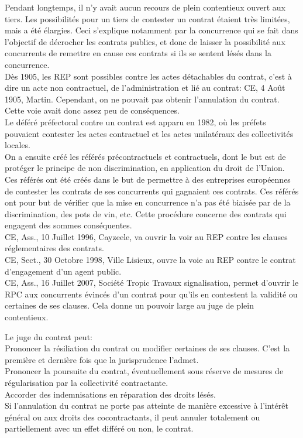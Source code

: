 \documentclass[10pt, a4paper, openany]{book}
\begin{document}
Pendant longtemps, il n'y avait aucun recours de plein contentieux ouvert aux tiers. Les possibilités pour un tiers de contester un contrat étaient très limitées, mais a été élargies. Ceci s'explique notamment par la concurrence qui se fait dans l'objectif de décrocher les contrats publics, et donc de laisser la possibilité aux concurrents de remettre en cause ces contrats si ils se sentent lésés dans la concurrence. \\
Dès 1905, les REP sont possibles contre les actes détachables du contrat, c'est à dire un acte non contractuel, de l'administration et lié au contrat: CE, 4 Août 1905, Martin. Cependant, on ne pouvait pas obtenir l'annulation du contrat. Cette voie avait donc assez peu de conséquences. \\
Le déféré préfectoral contre un contrat est apparu en 1982, où les préfets pouvaient contester les actes contractuel et les actes unilatéraux des collectivités locales. \\
On a ensuite créé les référés précontractuels et contractuels, dont le but est de protéger le principe de non discrimination, en application du droit de l'Union. Ces référés ont été créés dans le but de permettre à des entreprises européennes de contester les contrats de ses concurrents qui gagnaient ces contrats. Ces référés ont pour but de vérifier que la mise en concurrence n'a pas été biaisée par de la discrimination, des pots de vin, etc. Cette procédure concerne des contrats qui engagent des sommes conséquentes. \\
CE, Ass., 10 Juillet 1996, Cayzeele, va ouvrir la voir au REP contre les clauses réglementaires des contrats. \\
CE, Sect., 30 Octobre 1998, Ville Lisieux, ouvre la voie au REP contre le contrat d'engagement d'un agent public. \\
CE, Ass., 16 Juillet 2007, Société Tropic Travaux signalisation, permet d'ouvrir le RPC aux concurrents évincés d'un contrat pour qu'ils en contestent la validité ou certaines de ses clauses. Cela donne un pouvoir large au juge de plein contentieux. 


Le juge du contrat peut: \\
Prononcer la résiliation du contrat ou modifier certaines de ses clauses. C'est la première et dernière fois que la jurisprudence l'admet. \\
Prononcer la poursuite du contrat, éventuellement sous réserve de mesures de régularisation par la collectivité contractante. \\
Accorder des indemnisations en réparation des droits lésés. \\
Si l'annulation du contrat ne porte pas atteinte de manière excessive à l'intérêt général ou aux droits des cocontractants, il peut annuler totalement ou partiellement avec un effet différé ou non, le contrat. 
\end{document}
